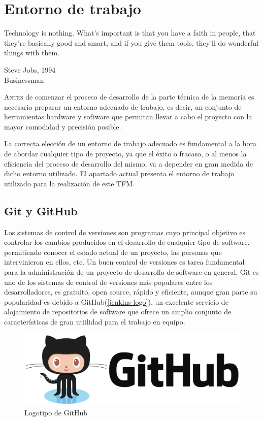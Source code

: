\chapter{Entorno de trabajo}\label{chp-03}
\epigraph{Technology is nothing. What's important is that you have a faith in people, that they're basically good and smart, and if you give them tools, they'll do wonderful things with them.}{Steve Jobs, 1994\\Businessman}

\lettrine[lraise=-0.1, lines=2, loversize=0.2]{A}{ntes} de comenzar el proceso de desarrollo de la parte técnica de la memoria es necesario preparar un entorno adecuado de trabajo, es decir, un conjunto de herramientas hardware y software que permitan llevar a cabo el proyecto con la mayor comodidad y precisión posible.

La correcta elección de un entorno de trabajo adecuado es fundamental a la hora de abordar cualquier tipo de proyecto, ya que el éxito o fracaso, o al menos la eficiencia del proceso de desarrollo del mismo, va a depender en gran medida de dicho entorno utilizado.
El apartado actual presenta el entorno de trabajo utilizado para la realización de este \gls{TFM}.

\section{Git y GitHub}

Los sistemas de control de versiones son programas cuyo principal objetivo es controlar los cambios producidos en el desarrollo de cualquier tipo de software, permitiendo conocer el estado actual de un proyecto, las personas que intervinieron en ellos, etc. Un buen control de versiones es tarea fundamental para la administración de un proyecto de desarrollo de software en general\cite{alcazar2014}. Git es uno de los sistemas de control de versiones más populares entre los desarrolladores, es gratuito, open source, rápido y eficiente, aunque gran parte su popularidad es debido a GitHub(\autoref{jenkins-logo}), un excelente servicio de alojamiento de repositorios de software que ofrece un amplio conjunto de características de gran utiilidad para el trabajo en equipo.

\begin{figure}[htbp]
	\centering
	\includegraphics[width=0.80\linewidth]
	{entorno/figuras/github.png}
	\caption{Logotipo de GitHub}
	\label{github-logo}
\end{figure}

